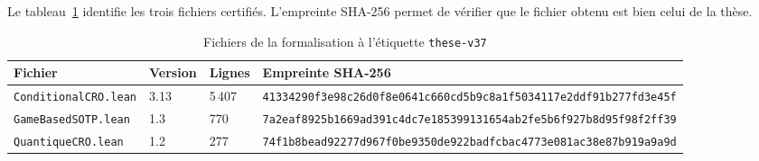 \begin{sloppypar}
Le tableau~\ref{tab:lean4_fichiers} identifie les trois fichiers certifi\'es. L'empreinte
SHA-256 permet de v\'erifier que le fichier obtenu est bien celui de la th\`ese.
\end{sloppypar}

\begin{table}[htbp]
\centering
\caption{Fichiers de la formalisation \`a l'\'etiquette \texttt{these-v37}}
\label{tab:lean4_fichiers}
\footnotesize
\begin{tabular}{@{}p{3.3cm}p{1.1cm}p{1.1cm}p{8cm}@{}}
\toprule
\textbf{Fichier} & \textbf{Version} & \textbf{Lignes} & \textbf{Empreinte SHA-256} \\
\midrule
\texttt{ConditionalCRO.lean} & 3.13 & 5\,407 & \texttt{41334290f3e98c26d0f8e0641c660cd5\allowbreak b9c8a1f5034117e2ddf91b277fd3e45f} \\
\texttt{GameBasedSOTP.lean} & 1.3 & 770 & \texttt{7a2eaf8925b1669ad391c4dc7e185399\allowbreak 131654ab2fe5b6f927b8d95f98f2ff39} \\
\texttt{QuantiqueCRO.lean} & 1.2 & 277 & \texttt{74f1b8bead92277d967f0be9350de922\allowbreak badfcbac4773e081ac38e87b919a9a9d} \\
\bottomrule
\end{tabular}
\end{table}

